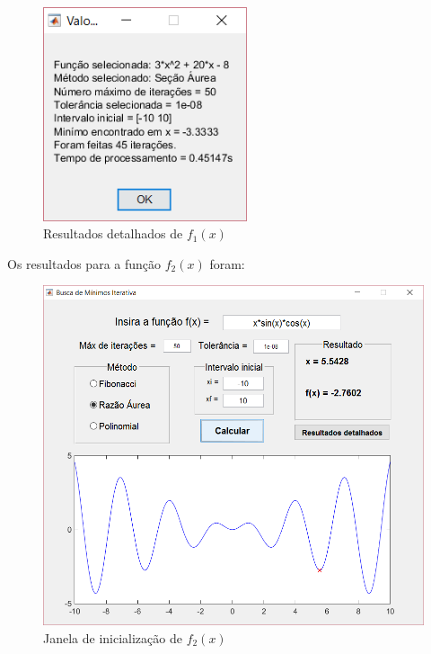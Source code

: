 \begin{figure}[h!]
	\begin{center}
		\includegraphics[width=6cm]{../aurea/f1_resultados.png}   
		\caption{Resultados detalhados de $ f_1(x) $}
		\label{fig:f1_resultados}
	\end{center}
\end{figure}

Os resultados para a função $ f_2(x) $ foram:

\begin{figure}[h]
	\begin{center}
		\includegraphics[width=14cm]{../aurea/f2_gui.png}   
		\caption{Janela de inicialização de $ f_2(x) $}
		\label{fig:f2_gui}
	\end{center}
\end{figure}

